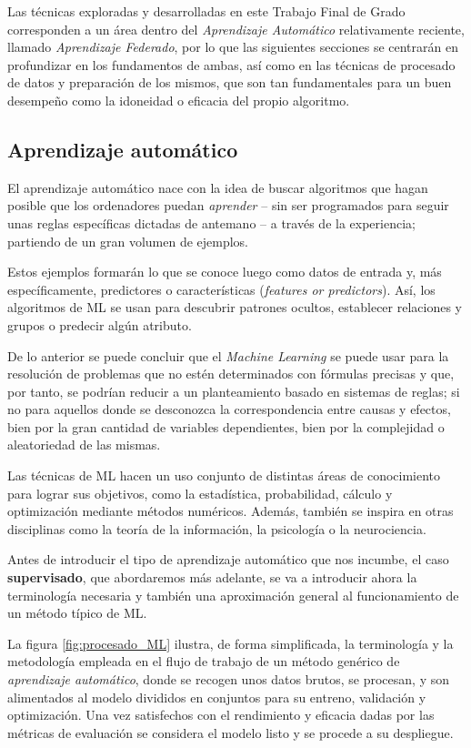 \documentclass[00-Trabajo_Final.tex]{subfiles}
\begin{document}
Las técnicas exploradas y desarrolladas en este Trabajo Final de Grado corresponden a un área dentro del \textit{Aprendizaje Automático} relativamente reciente, llamado \textit{Aprendizaje Federado}, por lo que las siguientes secciones se centrarán en profundizar en los fundamentos de ambas, así como en las técnicas de procesado de datos y preparación de los mismos, que son tan fundamentales para un buen desempeño como la idoneidad o eficacia del propio algoritmo.

\subsection{Aprendizaje automático}
El aprendizaje automático nace con la idea de buscar algoritmos que hagan posible que los ordenadores puedan \textit{aprender}{ }--{ }sin ser programados para seguir unas reglas específicas dictadas de antemano{ }--{ }a través de la experiencia; partiendo de un gran volumen de ejemplos.

Estos ejemplos formarán lo que se conoce luego como datos de entrada y, más específicamente, predictores o características (\textit{features or predictors}). Así, los algoritmos de ML se usan para descubrir patrones ocultos, establecer relaciones y grupos o predecir algún atributo.

De lo anterior se puede concluir que el \textit{Machine Learning} se puede usar para la resolución de problemas que no estén determinados con fórmulas precisas y que, por tanto, se podrían reducir a un planteamiento basado en sistemas de reglas; si no para aquellos donde se desconozca la correspondencia entre causas y efectos, bien por la gran cantidad de variables dependientes, bien por la complejidad o aleatoriedad de las mismas.

Las técnicas de ML hacen un uso conjunto de distintas áreas de conocimiento para lograr sus objetivos, como la estadística, probabilidad, cálculo y optimización mediante métodos numéricos. Además, también se inspira en otras disciplinas como la teoría de la información, la psicología o la neurociencia.

Antes de introducir el tipo de aprendizaje automático que nos incumbe, el caso \textbf{supervisado}, que abordaremos más adelante, se va a introducir ahora la terminología necesaria y también una aproximación general al funcionamiento de un método típico de ML.

La figura \ref{fig:procesado_ML} ilustra, de forma simplificada, la terminología y la metodología empleada en el flujo de trabajo de un método genérico de \textit{aprendizaje automático}, donde se recogen unos datos brutos, se procesan, y son alimentados al modelo divididos en conjuntos para su  entreno, validación y optimización. Una vez satisfechos con el rendimiento y eficacia dadas por las métricas de evaluación se considera el modelo listo y se procede a su despliegue.
\end{document}
